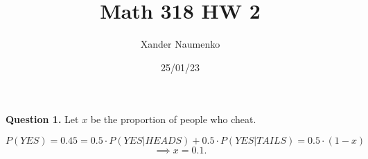 \documentclass[letterpaper, reqno,11pt]{article}
\begin{document}
\title{Math 318 HW 2}
\date{25/01/23}
\author{Xander Naumenko}
\maketitle

{\medskip\noindent\bf Question 1.} Let $x$ be the proportion of people who cheat. 

\[
P(YES)=0.45=0.5\cdot P(YES|HEADS)+0.5\cdot P(YES|TAILS)=0.5\cdot (1-x)
\]
\[
\implies x=0.1
.\]
\end{document}
